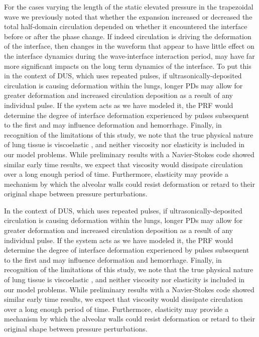 For the cases varying the length of the static elevated pressure in
the trapezoidal wave we previously noted that whether the expansion
increased or decreased the total half-domain circulation depended on
whether it encountered the interface before or after the phase
change. If indeed circulation is driving the deformation of the
interface, then changes in the waveform that appear to have 
little effect on the interface dynamics during the wave-interface
interaction period, may have far more significant impacts on the long
term dynamics of the interface. To put this in the context of
\ac{DUS}, which uses repeated pulses, if ultrasonically-deposited
circulation is causing deformation within the lungs, longer \acp{PD}
may allow for greater deformation and increased circulation deposition
as a result of any individual pulse. If the system acts as we have
modeled it, the \ac{PRF} would determine the degree of interface
deformation experienced by pulses subsequent to the first and may
influence deformation and hemorrhage. Finally, in recognition of the
limitations of this study, we note that the true physical nature of
lung tissue is viscoelastic \citep{Bayliss1939}, and neither viscosity
nor elasticity is included in our model problems. While preliminary
results with a Navier-Stokes code showed similar early time results,
we expect that viscosity would dissipate circulation over a long
enough period of time. Furthermore, elasticity may provide a mechanism
by which the alveolar walls could resist deformation or retard to
their original shape between pressure perturbations.

In the context of \ac{DUS}, which uses repeated pulses, if
ultrasonically-deposited circulation is causing deformation within the
lungs, longer \acp{PD} may allow for greater deformation and increased
circulation deposition as a result of any individual pulse. If the
system acts as we have modeled it, the \ac{PRF} would determine the
degree of interface deformation experienced by pulses subsequent to
the first and may influence deformation and hemorrhage. Finally, in
recognition of the limitations of this study, we note that the true
physical nature of lung tissue is viscoelastic \citep{Bayliss1939},
and neither viscosity nor elasticity is included in our model
problems. While preliminary results with a Navier-Stokes code showed
similar early time results, we expect that viscosity would dissipate
circulation over a long enough period of time. Furthermore, elasticity
may provide a mechanism by which the alveolar walls could resist
deformation or retard to their original shape between pressure
perturbations.



